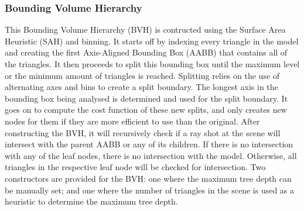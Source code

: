 \documentclass{article}
\begin{document}
    \subsubsection{Bounding Volume Hierarchy}
    This Bounding Volume Hierarchy (BVH) is contructed using the Surface Area Heuristic (SAH) and binning. 
    It starts off by indexing every triangle in the model and creating the first Axis-Aligned Bounding Box 
    (AABB) that contains all of the triangles. It then proceeds to split this bounding box until the maximum 
    level or the minimum amount of triangles is reached. Splitting relies on the use of alternating axes and 
    bins to create a split boundary. The longest axis in the bounding box being analysed is determined and
    used for the split boundary. It goes on to compute the cost function of these new splits, and only 
    creates new nodes for them if they are more efficient to use than the original. After constructing the 
    BVH, it will recursively check if a ray shot at the scene will intersect with the parent AABB or any of 
    its children. If there is no intersection with any of the leaf nodes, there is no intersection with the 
    model. Otherwise, all triangles in the respective leaf node will be checked for intersection.
    Two constructors are provided for the BVH: one where the maximum tree depth can be manually set;
    and one where the number of triangles in the scene is used as a heuristic to determine the maximum
    tree depth.
\end{document}
